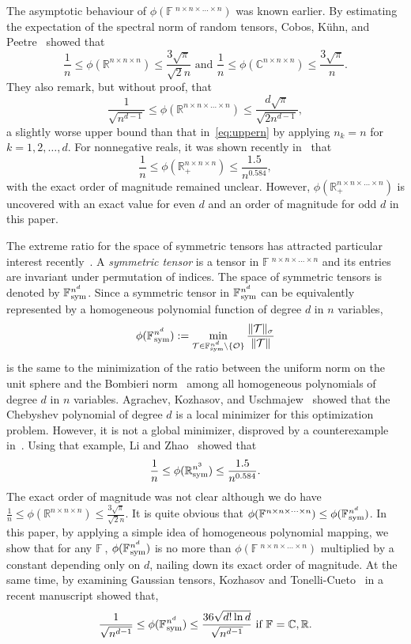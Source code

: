 \documentclass[11pt]{article}
\newcommand{\C}{\mathbb{C}}
\newcommand{\R}{\mathbb{R}}
\newcommand{\BF}{\mathbb{F}\:\!}
\newcommand{\OO}{\mathcal{O}}
\newcommand{\TT}{\mathcal{T}}
\newcommand{\sym}{\textnormal{sym}}
\begin{document}
The asymptotic behaviour of $\phi(\BF^{n\times n\times \dots \times n})$ was known earlier. By estimating the expectation of the spectral
norm of random tensors, Cobos, K\"uhn, and Peetre~\cite{CKP99} showed that
$$
\frac{1}{n}\le\phi(\R^{n\times n\times n}) \le\frac{3\sqrt{\pi}}{\sqrt{2}n} \mbox{ and }
\frac{1}{n}\le\phi(\C^{n\times n\times n})\le\frac{3\sqrt{\pi}}{n}.
$$
They also remark, but without proof, that
$$
\frac{1}{\sqrt{n^{d-1}}}\le\phi(\R^{n\times n\times\dots \times n})\le\frac{d\sqrt{\pi}}{\sqrt{2n^{d-1}}},
$$
a slightly worse upper bound than that in~\eqref{eq:uppern} by applying $n_k=n$ for $k=1,2,\dots,d$. For nonnegative reals, it was shown recently in~\cite{LZ20} that
$$
\frac{1}{n}\le\phi(\R_+^{n\times n\times n}) \le\frac{1.5}{n^{0.584}},
$$
with the exact order of magnitude remained unclear. However, $\phi(\R_+^{n\times n\times \dots \times n})$ is uncovered with an exact value for even $d$ and an order of magnitude for odd $d$ in this paper.

The extreme ratio for the space of symmetric tensors has attracted particular interest recently~\cite{AKU20,KT22}. A {\em symmetric tensor} is a tensor in $\BF^{n\times n\times\dots \times n}$ and its entries are invariant under permutation of indices. The space of symmetric tensors is denoted by $\BF^{n^d}_\sym$. Since a symmetric tensor in $\BF^{n^d}_\sym$ can be equivalently represented by a homogeneous polynomial function of degree $d$ in $n$ variables, $$\phi(\BF^{n^d}_\sym):=\min_{\TT\in\BF^{n^d}_\sym\setminus\{\OO\}}\frac{\|\TT\|_\sigma}{\|\TT\|}$$
is the same to the minimization of the ratio
between the uniform norm on the unit sphere and the Bombieri norm~\cite{BBEM90} among all homogeneous polynomials of degree $d$ in $n$ variables. Agrachev, Kozhasov, and Uschmajew~\cite{AKU20} showed that the Chebyshev polynomial of degree $d$ is a local minimizer for this optimization problem. However, it is not a global minimizer, disproved by a counterexample in~\cite{LZ20}. Using that example, Li and Zhao~\cite{LZ20} showed that
$$\frac{1}{n}\le\phi(\R^{n^3}_\sym) \le\frac{1.5}{n^{0.584}}.$$
The exact order of magnitude was not clear although we do have $\frac{1}{n} \le \phi(\R^{n\times n\times n})\le \frac{3\sqrt{\pi}}{\sqrt{2}n}$. It is quite obvious that $\phi(\BF^{n\times n\times \dots\times n})\le \phi(\BF^{n^d}_\sym)$. In this paper, by applying a simple idea of homogeneous polynomial mapping, we show that for any $\BF$, $\phi(\BF^{n^d}_\sym)$ is no more than $\phi(\BF^{n\times n\times \dots\times n})$ multiplied by a constant depending only on $d$, nailing down its exact order of magnitude. At the same time, by examining Gaussian tensors, Kozhasov and Tonelli-Cueto~\cite{KT22} in a recent manuscript showed that,
$$
\frac{1}{\sqrt{n^{d-1}}}\le \phi(\BF^{n^d}_\sym) \le\frac{36\sqrt{d!\ln d}}{\sqrt{n^{d-1}}} \mbox{ if }\BF=\C,\R.
$$
\end{document}
